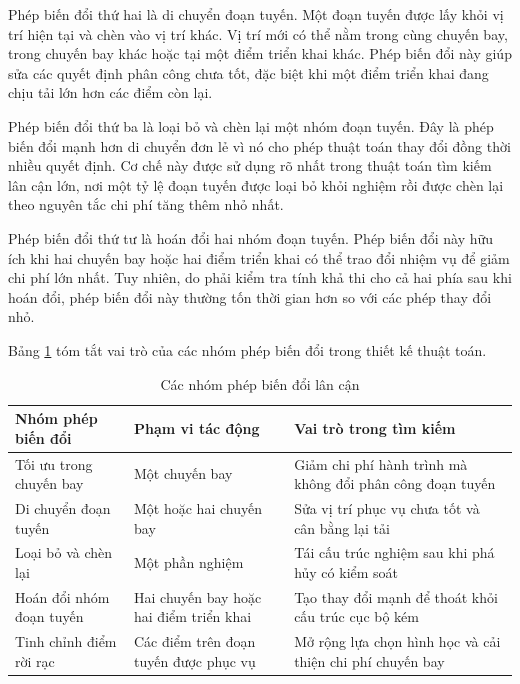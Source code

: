 Phép biến đổi thứ hai là di chuyển đoạn tuyến. Một đoạn tuyến được lấy khỏi vị trí hiện tại và chèn vào vị trí khác. Vị trí mới có thể nằm trong cùng chuyến bay, trong chuyến bay khác hoặc tại một điểm triển khai khác. Phép biến đổi này giúp sửa các quyết định phân công chưa tốt, đặc biệt khi một điểm triển khai đang chịu tải lớn hơn các điểm còn lại.

Phép biến đổi thứ ba là loại bỏ và chèn lại một nhóm đoạn tuyến. Đây là phép biến đổi mạnh hơn di chuyển đơn lẻ vì nó cho phép thuật toán thay đổi đồng thời nhiều quyết định. Cơ chế này được sử dụng rõ nhất trong thuật toán tìm kiếm lân cận lớn, nơi một tỷ lệ đoạn tuyến được loại bỏ khỏi nghiệm rồi được chèn lại theo nguyên tắc chi phí tăng thêm nhỏ nhất.

Phép biến đổi thứ tư là hoán đổi hai nhóm đoạn tuyến. Phép biến đổi này hữu ích khi hai chuyến bay hoặc hai điểm triển khai có thể trao đổi nhiệm vụ để giảm chi phí lớn nhất. Tuy nhiên, do phải kiểm tra tính khả thi cho cả hai phía sau khi hoán đổi, phép biến đổi này thường tốn thời gian hơn so với các phép thay đổi nhỏ.

Bảng \ref{tab:chapter4-neighborhoods} tóm tắt vai trò của các nhóm phép biến đổi trong thiết kế thuật toán.

\begin{table}[H]
\centering
\caption{Các nhóm phép biến đổi lân cận}
\label{tab:chapter4-neighborhoods}
\begin{tabular}{|p{3.8cm}|p{4.8cm}|p{4.8cm}|}
\hline
\textbf{Nhóm phép biến đổi} & \textbf{Phạm vi tác động} & \textbf{Vai trò trong tìm kiếm} \\
\hline
Tối ưu trong chuyến bay & Một chuyến bay & Giảm chi phí hành trình mà không đổi phân công đoạn tuyến \\
\hline
Di chuyển đoạn tuyến & Một hoặc hai chuyến bay & Sửa vị trí phục vụ chưa tốt và cân bằng lại tải \\
\hline
Loại bỏ và chèn lại & Một phần nghiệm & Tái cấu trúc nghiệm sau khi phá hủy có kiểm soát \\
\hline
Hoán đổi nhóm đoạn tuyến & Hai chuyến bay hoặc hai điểm triển khai & Tạo thay đổi mạnh để thoát khỏi cấu trúc cục bộ kém \\
\hline
Tinh chỉnh điểm rời rạc & Các điểm trên đoạn tuyến được phục vụ & Mở rộng lựa chọn hình học và cải thiện chi phí chuyến bay \\
\hline
\end{tabular}
\end{table}

